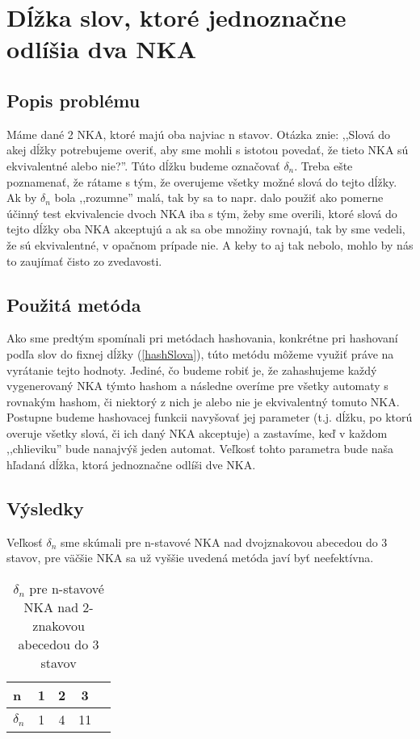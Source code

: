 \label{safeWordLength}
\section{Dĺžka slov, ktoré jednoznačne odlíšia dva NKA}


\subsection{Popis problému}
Máme dané 2 NKA, ktoré majú oba najviac n stavov. Otázka znie: ,,Slová do akej dĺžky potrebujeme overiť, aby sme mohli s istotou povedať, že tieto NKA sú ekvivalentné alebo nie?''. Túto dĺžku budeme označovať $\delta_n$. Treba ešte poznamenať, že rátame s tým, že overujeme všetky možné slová do tejto dĺžky.  Ak by $\delta_n$ bola ,,rozumne'' malá, tak by sa to napr. dalo použiť ako pomerne účinný test ekvivalencie dvoch NKA iba s tým, žeby sme overili, ktoré slová do tejto dĺžky oba NKA akceptujú a ak sa obe množiny rovnajú, tak by sme vedeli, že sú ekvivalentné, v opačnom prípade nie. A keby to aj tak nebolo, mohlo by nás to zaujímať čisto zo zvedavosti. 

\subsection{Použitá metóda}
Ako sme predtým spomínali pri metódach hashovania, konkrétne pri hashovaní podľa slov do fixnej dĺžky (\ref{hashSlova}), túto metódu môžeme využiť práve na vyrátanie tejto hodnoty. Jediné, čo budeme robiť je, že zahashujeme každý vygenerovaný NKA týmto hashom a následne overíme pre všetky automaty s rovnakým hashom, či niektorý z nich je alebo nie je ekvivalentný tomuto NKA. Postupne budeme hashovacej funkcii navyšovať jej parameter (t.j. dĺžku, po ktorú overuje všetky slová, či ich daný NKA akceptuje) a zastavíme, keď v každom ,,chlieviku'' bude nanajvýš jeden automat. Veľkosť tohto parametra bude naša hľadaná dĺžka, ktorá jednoznačne odlíši dve NKA.

\subsection{Výsledky}

Veľkosť $\delta_n$ sme skúmali pre n-stavové NKA nad dvojznakovou abecedou do 3 stavov, pre väčšie NKA sa už vyššie uvedená metóda javí byť neefektívna.

\begin{table}[h]
  \centering
  \begin{tabular}{|l|c|c|c|r|}
    \hline
    n & 1 & 2 & 3 \\ 
    \hline
    $\delta_n$ & 1 & 4 & 11 \\ 
    \hline
  \end{tabular}
  \caption{$\delta_n$ pre n-stavové  NKA nad 2-znakovou abecedou do 3 stavov}
\end{table}

